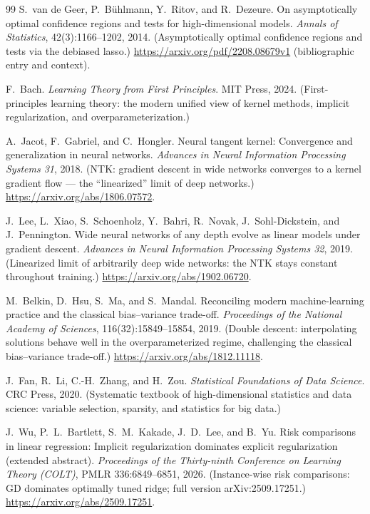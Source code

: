 \documentclass[11pt, a4paper]{article}
\theoremstyle{plain}
\theoremstyle{definition}
\theoremstyle{remark}
\begin{document}
\begin{thebibliography}{99}
S.~van de Geer, P.~B\"uhlmann, Y.~Ritov, and R.~Dezeure.
\newblock On asymptotically optimal confidence regions and tests for high-dimensional models.
\newblock \emph{Annals of Statistics}, 42(3):1166--1202, 2014. (Asymptotically optimal confidence regions and tests via the debiased lasso.)
\newblock \url{https://arxiv.org/pdf/2208.08679v1} (bibliographic entry and context).

F.~Bach.
\newblock \emph{Learning Theory from First Principles}.
\newblock MIT Press, 2024. (First-principles learning theory: the modern unified view of kernel methods, implicit regularization, and overparameterization.)

A.~Jacot, F.~Gabriel, and C.~Hongler.
\newblock Neural tangent kernel: Convergence and generalization in neural networks.
\newblock \emph{Advances in Neural Information Processing Systems 31}, 2018. (NTK: gradient descent in wide networks converges to a kernel gradient flow --- the ``linearized'' limit of deep networks.)
\newblock \url{https://arxiv.org/abs/1806.07572}.

J.~Lee, L.~Xiao, S.~Schoenholz, Y.~Bahri, R.~Novak, J.~Sohl-Dickstein, and J.~Pennington.
\newblock Wide neural networks of any depth evolve as linear models under gradient descent.
\newblock \emph{Advances in Neural Information Processing Systems 32}, 2019. (Linearized limit of arbitrarily deep wide networks: the NTK stays constant throughout training.)
\newblock \url{https://arxiv.org/abs/1902.06720}.

M.~Belkin, D.~Hsu, S.~Ma, and S.~Mandal.
\newblock Reconciling modern machine-learning practice and the classical bias--variance trade-off.
\newblock \emph{Proceedings of the National Academy of Sciences}, 116(32):15849--15854, 2019. (Double descent: interpolating solutions behave well in the overparameterized regime, challenging the classical bias--variance trade-off.)
\newblock \url{https://arxiv.org/abs/1812.11118}.

J.~Fan, R.~Li, C.-H.~Zhang, and H.~Zou.
\newblock \emph{Statistical Foundations of Data Science}.
\newblock CRC Press, 2020. (Systematic textbook of high-dimensional statistics and data science: variable selection, sparsity, and statistics for big data.)

J.~Wu, P.~L.~Bartlett, S.~M.~Kakade, J.~D.~Lee, and B.~Yu.
\newblock Risk comparisons in linear regression: Implicit regularization dominates explicit regularization (extended abstract).
\newblock \emph{Proceedings of the Thirty-ninth Conference on Learning Theory (COLT)}, PMLR 336:6849--6851, 2026. (Instance-wise risk comparisons: GD dominates optimally tuned ridge; full version arXiv:2509.17251.)
\newblock \url{https://arxiv.org/abs/2509.17251}.


\end{thebibliography}
\end{document}
